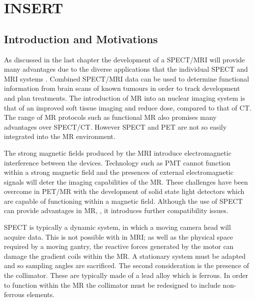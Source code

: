 \chapter{INSERT}
\label{LitRev}

\section{Introduction and Motivations}
As discussed in the last chapter the development of a \acrshort{SPECT/MRI} will provide many advantages due to the diverse applications that the individual \acrshort{SPECT} and \acrshort{MRI} systems  \cite{doi:10.1259/bjr.20160690}. Combined \acrshort{SPECT/MRI} data can be used to determine functional information from brain scans of known tumours in order to track development and plan treatments. The introduction of \acrshort{MR} into an nuclear imaging system is that of an improved soft tissue imaging and reduce dose, compared to that of \acrshort{CT}. The range of \acrshort{MR} protocols such as functional \acrshort{MR} also promises many advantages over \acrshort{SPECT/CT}. However \acrshort{SPECT} and \acrshort{PET} are not so easily integrated into the \acrshort{MR} environment. 

The strong magnetic fields produced by the \acrshort{MRI} introduce electromagnetic interference between the devices. Technology such as \acrshort{PMT} cannot function within a strong magnetic field and the presences of external electromagnetic signals will deter the imaging capabilities of the \acrshort{MR}. These challenges have been overcome in \acrshort{PET/MR} with the development of solid state light detectors which are capable of functioning within a magnetic field. Although the use of \acrshort{SPECT} can provide advantages in \acrshort{MR}, \cite{doi:10.1177/153303460600500406}, it introduces further compatibility issues.

\acrshort{SPECT} is typically a dynamic system, in which a moving camera head will acquire data. This is not possible with in \acrshort{MRI}; as well as the physical space required by a moving gantry, the reactive forces generated by the motor can damage the gradient coils within the \acrshort{MR}. A stationary system must be adapted and so sampling angles are sacrificed. The second consideration is the presence of the collimator. These are typically made of a lead alloy which is ferrous. In order to function within the \acrshort{MR} the collimator must be redesigned to include non-ferrous elements. 

